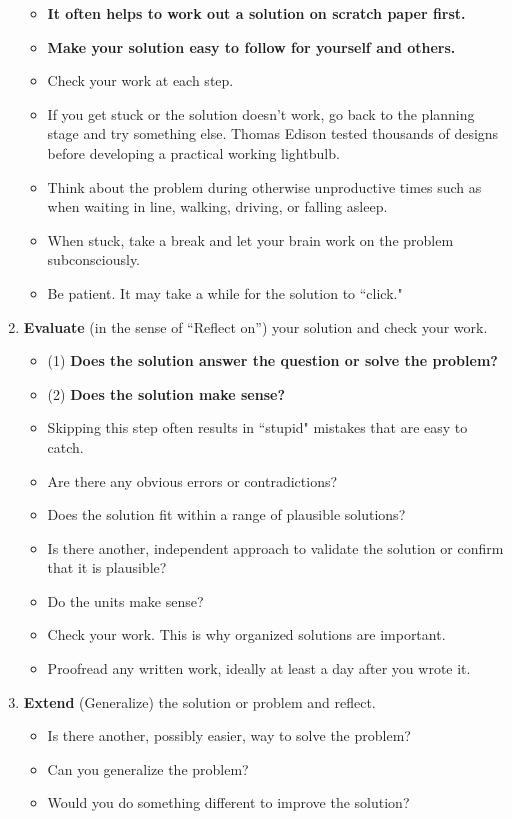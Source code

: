 \begin{enumerate}
\begin{itemize}
    \item {\bf It often helps to work out a solution on scratch paper first.}
    \item {\bf Make your solution easy to follow for yourself and others.}
    \item Check your work at each step.
    \item If you get stuck or the solution doesn't work, go back to the planning stage and try something else. Thomas Edison tested thousands of designs before developing a practical working lightbulb.
    \item Think about the problem during otherwise unproductive times such as when waiting in line, walking, driving, or falling asleep.
    \item When stuck, take a break and let your brain work on the problem subconsciously.
    \item Be patient. It may take a while for the solution to ``click."
\end{itemize}
\item {\bf Evaluate} (in the sense of ``Reflect on'') your solution and check your work.
\begin{itemize}
    \item (1) {\bf Does the solution answer the question or solve the problem?}
    \item (2) {\bf Does the solution make sense?}
    \item Skipping this step often results in ``stupid" mistakes that are easy to catch.
    \item Are there any obvious errors or contradictions?
    \item Does the solution fit within a range of plausible solutions?
    \item Is there another, independent approach to validate the solution or confirm that it is plausible?
    \item Do the units make sense?
    \item Check your work. This is why organized solutions are important.
    \item Proofread any written work, ideally at least a day after you wrote it.
\end{itemize}
\item {\bf Extend} (Generalize) the solution or problem and reflect.
\begin{itemize}
    \item Is there another, possibly easier, way to solve the problem?
    \item Can you generalize the problem?
    \item Would you do something different to improve the solution?
\end{itemize}
\end{enumerate}

